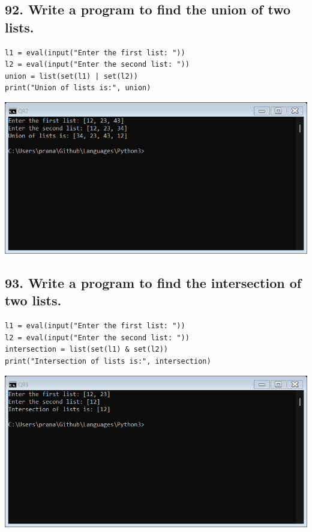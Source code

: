 \documentclass[12pt]{article}
\begin{document}
\subsection*{92. Write a program to find the union of two lists.}
\begin{verbatim}
l1 = eval(input("Enter the first list: "))
l2 = eval(input("Enter the second list: "))
union = list(set(l1) | set(l2))
print("Union of lists is:", union)
\end{verbatim}
\includegraphics[width=\linewidth]{images/92.png}

\subsection*{93. Write a program to find the intersection of two lists.}
\begin{verbatim}
l1 = eval(input("Enter the first list: "))
l2 = eval(input("Enter the second list: "))
intersection = list(set(l1) & set(l2))
print("Intersection of lists is:", intersection)
\end{verbatim}
\includegraphics[width=\linewidth]{images/93.png}
\end{document}
